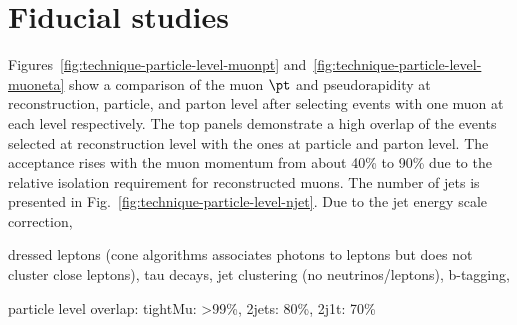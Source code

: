 \section{Fiducial studies}
\label{sec:prospects-fiducial-studies}



Figures~\ref{fig:technique-particle-level-muonpt} and~\ref{fig:technique-particle-level-muoneta} show a comparison of the muon $\pt$ and pseudorapidity at reconstruction, particle, and parton level after selecting events with one muon at each level respectively. The top panels demonstrate a high overlap of the events selected at reconstruction level with the ones at particle and parton level. The acceptance rises with the muon momentum from about 40\% to 90\% due to the relative isolation requirement for reconstructed muons. The number of jets is presented in Fig.~\ref{fig:technique-particle-level-njet}. Due to the jet energy scale correction, 


dressed leptons (cone algorithms associates photons to leptons but does not cluster close leptons), tau decays, jet clustering (no neutrinos/leptons), b-tagging,




particle level overlap: tightMu: >99\%, 2jets: 80\%, 2j1t: 70\%


